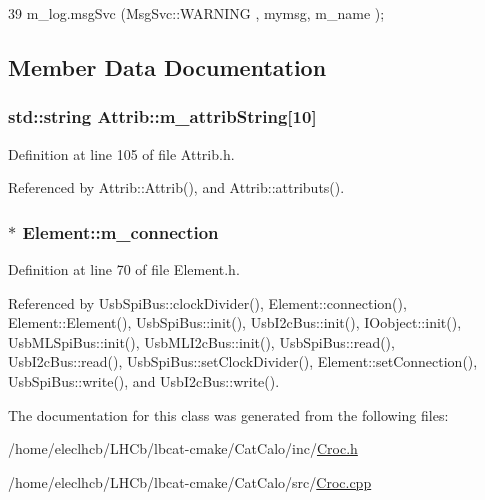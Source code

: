 \begin{DoxyCode}
39 { m_log.msgSvc (MsgSvc::WARNING , mymsg, m_name ); }
\end{DoxyCode}


\subsection{Member Data Documentation}
\hypertarget{classAttrib_a3414521d7a82476e874b25a5407b5e63}{
\subsubsection[{m\_\-attribString}]{\setlength{\rightskip}{0pt plus 5cm}std::string {\bf Attrib::m\_\-attribString}\mbox{[}10\mbox{]}}}
\label{classAttrib_a3414521d7a82476e874b25a5407b5e63}


Definition at line 105 of file Attrib.h.

Referenced by Attrib::Attrib(), and Attrib::attributs().\hypertarget{classElement_abe3de7a5dbbc9a6dd2d7e012e5fdb266}{
\subsubsection[{m\_\-connection}]{$\ast$ {\bf Element::m\_\-connection}}}
\label{classElement_abe3de7a5dbbc9a6dd2d7e012e5fdb266}


Definition at line 70 of file Element.h.

Referenced by UsbSpiBus::clockDivider(), Element::connection(), Element::Element(), UsbSpiBus::init(), UsbI2cBus::init(), IOobject::init(), UsbMLSpiBus::init(), UsbMLI2cBus::init(), UsbSpiBus::read(), UsbI2cBus::read(), UsbSpiBus::setClockDivider(), Element::setConnection(), UsbSpiBus::write(), and UsbI2cBus::write().

The documentation for this class was generated from the following files:\begin{DoxyCompactItemize}
\item 
/home/eleclhcb/LHCb/lbcat-\/cmake/CatCalo/inc/\hyperlink{Croc_8h}{Croc.h}\item 
/home/eleclhcb/LHCb/lbcat-\/cmake/CatCalo/src/\hyperlink{Croc_8cpp}{Croc.cpp}\end{DoxyCompactItemize}
